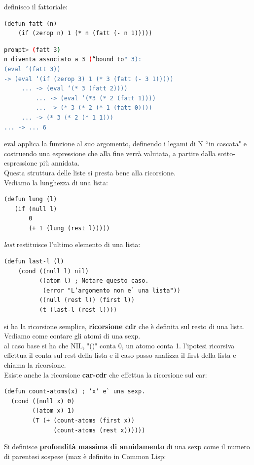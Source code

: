 \documentclass[a4paper,12pt, oneside]{book}
\begin{document}
\newpage
definisco il fattoriale:
\begin{verbatim}
(defun fatt (n)
    (if (zerop n) 1 (* n (fatt (- n 1)))))
\end{verbatim}
\begin{shaded}
\begin{lstlisting}[language=bash]
prompt> (fatt 3)
n diventa associato a 3 (“bound to" 3):
(eval ‘(fatt 3))
-> (eval ‘(if (zerop 3) 1 (* 3 (fatt (- 3 1)))))
     ... -> (eval ‘(* 3 (fatt 2))))
         ... -> (eval ‘(*3 (* 2 (fatt 1))))
         ... -> (* 3 (* 2 (* 1 (fatt 0))))
     ... -> (* 3 (* 2 (* 1 1)))
... -> ... 6
\end{lstlisting}
\end{shaded}
eval applica la funzione al suo argomento, definendo i legami di N “in cascata" e
costruendo una espressione che alla fine verrà valutata, a partire dalla sotto-espressione
più annidata.\\ Questa struttura delle liste si presta bene alla ricorsione. \\
Vediamo la lunghezza di una lista:
\begin{verbatim}
(defun lung (l)
   (if (null l)
       0
       (+ 1 (lung (rest l)))))
\end{verbatim}
\textit{last} restituisce l'ultimo elemento di una lista:
\begin{verbatim}
(defun last-l (l)
    (cond ((null l) nil)
          ((atom l) ; Notare questo caso.
           (error "L’argomento non e` una lista"))
          ((null (rest l)) (first l))
          (t (last-l (rest l))))
\end{verbatim}
si ha la ricorsione semplice, \textbf{ricorsione cdr} che è definita sul resto di una lista.\\
Vediamo come contare gli atomi di una sexp.\\
al caso base si ha che NIL, "()" conta 0, un atomo conta 1. l'ipotesi ricorsiva effettua il conta sul rest della lista e il caso passo analizza il first della lista e chiama la ricorsione.
\\
Esiste anche la ricorsione \textbf{car-cdr} che effettua la ricorsione sul car:
\begin{verbatim}
(defun count-atoms(x) ; ‘x’ e` una sexp.
  (cond ((null x) 0)
        ((atom x) 1)
        (T (+ (count-atoms (first x))
              (count-atoms (rest x))))))
\end{verbatim}
Si definisce \textbf{profondità massima di annidamento} di una sexp come il numero di parentesi sospese (max è definito in Common Lisp:
\end{document}
